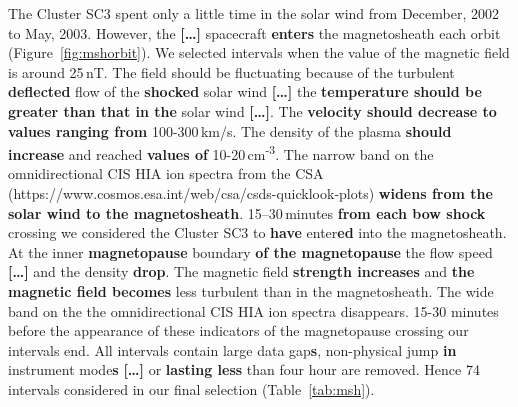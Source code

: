 \documentclass[linenumbers,draft]{agujournal}
\begin{document}
The Cluster SC3 spent only a little time in the solar wind from December, 2002 to May, 2003. However, the \textbf{[\dots]} spacecraft \textbf{enters} the magnetosheath  each orbit (Figure~\ref{fig:mshorbit}). We selected intervals when the value of the magnetic field is around 25\,nT. The field should be fluctuating because of the turbulent \textbf{deflected} flow of the \textbf{shocked} solar wind \textbf{[\dots]} the \textbf{temperature should be greater than that in the} solar wind \textbf{[\dots]}. The \textbf{velocity should decrease to values ranging from} 100-300\,km/s. The density of the plasma \textbf{should increase} and reached \textbf{values of} 10-20\,cm\textsuperscript{-3}.  The narrow band on the  omnidirectional CIS HIA ion spectra from the CSA (https://www.cosmos.esa.int/web/csa/csds-quicklook-plots) \textbf{widens from the solar wind to the magnetosheath}. 15--30\,minutes \textbf{from each bow shock} crossing we considered the Cluster SC3 to \textbf{have} enter\textbf{ed} into the magnetosheath. At the inner \textbf{magnetopause} boundary \textbf{of the magnetopause} the flow speed \textbf{[\dots]} and the density \textbf{drop}. The magnetic field \textbf{strength increases} and \textbf{the magnetic field becomes} less turbulent than in the magnetosheath. The wide band on the  the omnidirectional CIS HIA ion spectra disappears. 15-30 minutes before the appearance  of these indicators of the magnetopause crossing our intervals end. All intervals contain large data gap\textbf{s}, non-physical jump \textbf{in} instrument mode\textbf{s} \textbf{[\dots]} or \textbf{lasting less} than four hour are removed. Hence 74 intervals considered in our final selection (Table~\ref{tab:msh}). 
\end{document}
